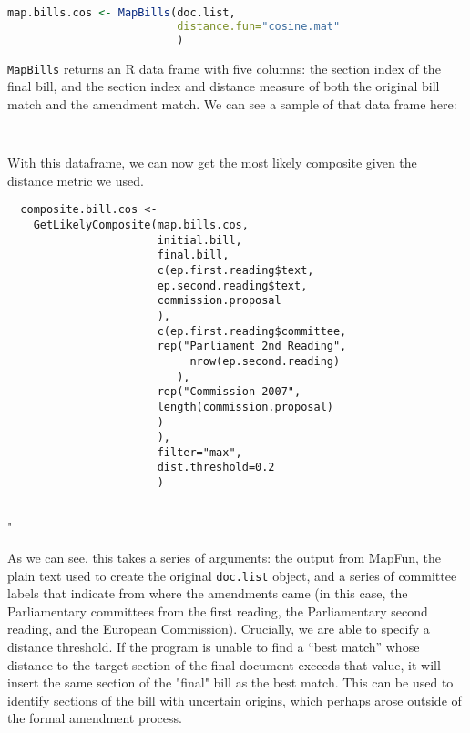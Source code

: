 \documentclass[11pt]{article}
\begin{document}
\begin{lstlisting}[language=R, numbers=none]
map.bills.cos <- MapBills(doc.list,
                          distance.fun="cosine.mat"
                          )
\end{lstlisting}

\texttt{MapBills} returns an R data frame with five columns: the
section index of the final bill, and the section index and distance
measure of both the original bill match and the amendment match. We
can see a sample of that data frame here:

\begin{lstlisting}
  
\end{lstlisting}

With this dataframe, we can now get the most likely composite given
the distance metric we used. 

\begin{lstlisting}
  composite.bill.cos <- 
    GetLikelyComposite(map.bills.cos,
                       initial.bill,
                       final.bill,
                       c(ep.first.reading$text,
                       ep.second.reading$text,
                       commission.proposal
                       ),
                       c(ep.first.reading$committee,
                       rep("Parliament 2nd Reading", 
                            nrow(ep.second.reading)
                          ),
                       rep("Commission 2007",
                       length(commission.proposal)
                       )
                       ),
                       filter="max",
                       dist.threshold=0.2
                       )
                       
\end{lstlisting}"

As we can see, this takes a series of arguments: the output from
MapFun, the plain text used to create the original \texttt{doc.list}
object, and a series of committee labels that indicate from where the
amendments came (in this case, the Parliamentary committees from the
first reading, the Parliamentary second reading, and the European
Commission). Crucially, we are able to specify a distance
threshold. If the program is unable to find a ``best match'' whose
distance to the target section of the final document exceeds that
value, it will insert the same section of the "final" bill as the best
match. This can be used to identify sections of the bill with
uncertain origins, which perhaps arose outside of the formal amendment
process. 
\end{document}

